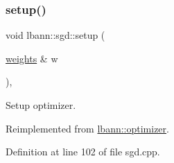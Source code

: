 \subsubsection{\texorpdfstring{setup()}{setup()}}
{\footnotesize\ttfamily void lbann\+::sgd\+::setup (\begin{DoxyParamCaption}\item[{\hyperlink{classlbann_1_1weights}{weights} \&}]{w }\end{DoxyParamCaption})\hspace{0.3cm}{\ttfamily [override]}, {\ttfamily [virtual]}}

Setup optimizer. 

Reimplemented from \hyperlink{classlbann_1_1optimizer_a7641a88b3c166df2d974a298622b992b}{lbann\+::optimizer}.



Definition at line 102 of file sgd.\+cpp.


